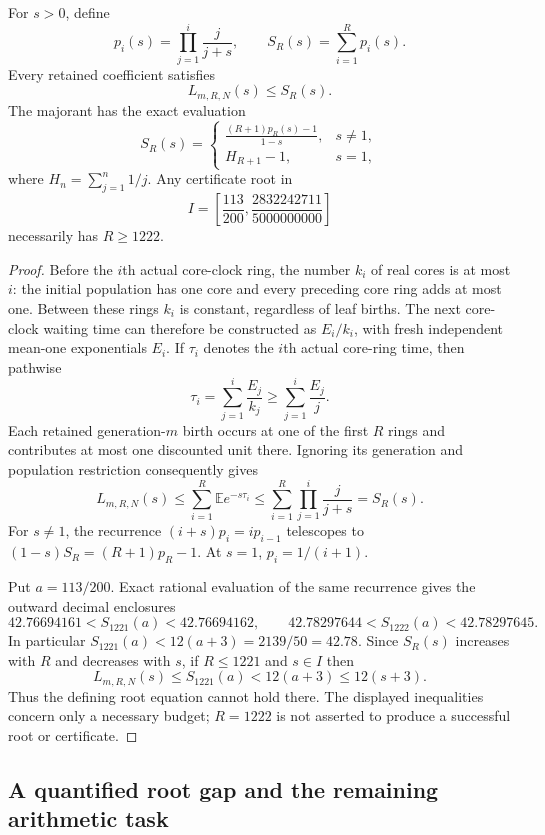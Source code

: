 \begin{proposition}\label{scp:ring-budget}
For $s>0$, define
\[
 p_i(s)=\prod_{j=1}^{i}\frac{j}{j+s},\qquad
 S_R(s)=\sum_{i=1}^{R}p_i(s).
\]
Every retained coefficient satisfies
\[
 L_{m,R,N}(s)\le S_R(s).
\]
The majorant has the exact evaluation
\[
 S_R(s)=
 \begin{cases}
 \displaystyle\frac{(R+1)p_R(s)-1}{1-s},&s\ne1,\\[6pt]
 H_{R+1}-1,&s=1,
 \end{cases}
\]
where $H_n=\sum_{j=1}^n1/j$. Any certificate root in
\[
 I=\left[\frac{113}{200},\frac{2832242711}{5000000000}\right]
\]
necessarily has $R\ge1222$.
\end{proposition}
\begin{proof}
Before the $i$th actual core-clock ring, the number $k_i$ of real
cores is at most $i$: the initial population has one core and every
preceding core ring adds at most one. Between these rings $k_i$ is
constant, regardless of leaf births. The next core-clock waiting time
can therefore be constructed as $E_i/k_i$, with fresh independent
mean-one exponentials $E_i$. If $\tau_i$ denotes the $i$th actual
core-ring time, then pathwise
\[
 \tau_i=\sum_{j=1}^{i}\frac{E_j}{k_j}
 \ge\sum_{j=1}^{i}\frac{E_j}{j}.
\]
Each retained generation-$m$ birth occurs at one of the first $R$
rings and contributes at most one discounted unit there. Ignoring its
generation and population restriction consequently gives
\[
 L_{m,R,N}(s)
 \le\sum_{i=1}^{R}\mathbb E e^{-s\tau_i}
 \le\sum_{i=1}^{R}\prod_{j=1}^{i}\frac{j}{j+s}=S_R(s).
\]
For $s\ne1$, the recurrence $(i+s)p_i=i p_{i-1}$ telescopes to
$(1-s)S_R=(R+1)p_R-1$. At $s=1$, $p_i=1/(i+1)$.

Put $a=113/200$. Exact rational evaluation of the same recurrence gives
the outward decimal enclosures
\[
 42.76694161<S_{1221}(a)<42.76694162,
 \qquad
 42.78297644<S_{1222}(a)<42.78297645.
\]
In particular $S_{1221}(a)<12(a+3)=2139/50=42.78$.
Since $S_R(s)$ increases with $R$ and decreases with $s$, if
$R\le1221$ and $s\in I$ then
\[
 L_{m,R,N}(s)\le S_{1221}(a)<12(a+3)\le12(s+3).
\]
Thus the defining root equation cannot hold there. The displayed
inequalities concern only a necessary budget; $R=1222$ is not asserted
to produce a successful root or certificate.
\end{proof}

\subsection{A quantified root gap and the remaining arithmetic task}

